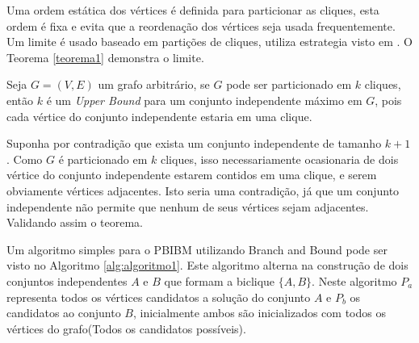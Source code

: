 Uma ordem estática dos vértices é definida para particionar as cliques, esta ordem é fixa e evita que a reordenação dos vértices seja usada frequentemente. 
Um limite é usado baseado em partições de cliques, utiliza estrategia visto em . 
O Teorema \ref{teorema1} demonstra o limite.

\begin{teorema}\label{teorema1}
    Seja $G=(V,E)$ um grafo arbitrário, se $G$ pode ser particionado em $k$ cliques, então $k$ é um \textit{Upper Bound} para um conjunto independente máximo em $G$, pois cada vértice do conjunto independente estaria em uma clique.
\end{teorema}
 
\begin{prova}
   Suponha por contradição que exista um conjunto independente de tamanho $k+1$. Como $G$ é particionado em $k$ cliques, isso necessariamente ocasionaria de dois vértice do conjunto independente estarem contidos em uma clique, e serem obviamente vértices adjacentes. Isto seria uma contradição, já que um conjunto independente não permite que nenhum de seus vértices sejam adjacentes. Validando assim o teorema.
 \end{prova}

Um algoritmo simples para o PBIBM utilizando Branch and Bound pode ser visto no Algoritmo \ref{alg:algoritmo1}. Este algoritmo alterna na construção de dois conjuntos independentes $A$ e $B$ que formam a biclique $\{A,B\}$. Neste algoritmo $P_a$ representa todos os vértices candidatos a solução do conjunto $A$ e $P_b$ os candidatos ao conjunto $B$, inicialmente ambos são inicializados com todos os vértices do grafo(Todos os candidatos possíveis).

